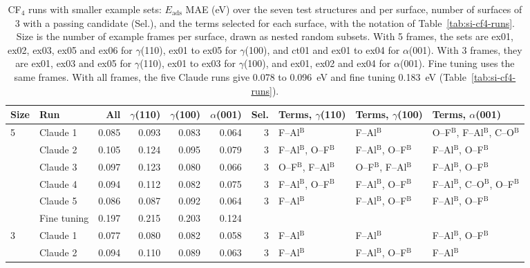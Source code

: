 \begin{table}[h]
\caption{CF$_4$ runs with smaller example sets: $E_\mathrm{ads}$ MAE (eV) over the seven test structures and per surface, number of surfaces of 3 with a passing candidate (Sel.), and the terms selected for each surface, with the notation of Table~\ref{tab:si-cf4-runs}. Size is the number of example frames per surface, drawn as nested random subsets. With 5 frames, the sets are ex01, ex02, ex03, ex05 and ex06 for $\gamma$(110), ex01 to ex05 for $\gamma$(100), and ct01 and ex01 to ex04 for $\alpha$(001). With 3 frames, they are ex01, ex03 and ex05 for $\gamma$(110), ex01 to ex03 for $\gamma$(100), and ex01, ex02 and ex04 for $\alpha$(001). Fine tuning uses the same frames. With all frames, the five Claude runs give 0.078 to 0.096~eV and fine tuning 0.183~eV (Table~\ref{tab:si-cf4-runs}).}\label{tab:si-cf4-nsub}
\scriptsize\renewcommand{\baselinestretch}{1}\selectfont
\setlength{\tabcolsep}{3pt}
\begin{tabular}{llrrrrrlll}
\toprule
Size & Run & All & $\gamma$(110) & $\gamma$(100) & $\alpha$(001) & Sel. & Terms, $\gamma$(110) & Terms, $\gamma$(100) & Terms, $\alpha$(001) \\
\midrule
5 & Claude 1 & 0.085 & 0.093 & 0.083 & 0.064 & 3 & F--Al$^\mathrm{B}$ & F--Al$^\mathrm{B}$ & O--F$^\mathrm{B}$, F--Al$^\mathrm{B}$, C--O$^\mathrm{B}$ \\
 & Claude 2 & 0.105 & 0.124 & 0.095 & 0.079 & 3 & F--Al$^\mathrm{B}$, O--F$^\mathrm{B}$ & F--Al$^\mathrm{B}$, O--F$^\mathrm{B}$ & F--Al$^\mathrm{B}$, O--F$^\mathrm{B}$ \\
 & Claude 3 & 0.097 & 0.123 & 0.080 & 0.066 & 3 & O--F$^\mathrm{B}$, F--Al$^\mathrm{B}$ & O--F$^\mathrm{B}$, F--Al$^\mathrm{B}$ & F--Al$^\mathrm{B}$, O--F$^\mathrm{B}$ \\
 & Claude 4 & 0.094 & 0.112 & 0.082 & 0.075 & 3 & F--Al$^\mathrm{B}$, O--F$^\mathrm{B}$ & F--Al$^\mathrm{B}$, O--F$^\mathrm{B}$ & F--Al$^\mathrm{B}$, C--O$^\mathrm{B}$, O--F$^\mathrm{B}$ \\
 & Claude 5 & 0.086 & 0.087 & 0.092 & 0.064 & 3 & F--Al$^\mathrm{B}$ & F--Al$^\mathrm{B}$, O--F$^\mathrm{B}$ & F--Al$^\mathrm{B}$, O--F$^\mathrm{B}$ \\
 & Fine tuning & 0.197 & 0.215 & 0.203 & 0.124 & & & & \\
\midrule
3 & Claude 1 & 0.077 & 0.080 & 0.082 & 0.058 & 3 & F--Al$^\mathrm{B}$ & F--Al$^\mathrm{B}$ & F--Al$^\mathrm{B}$, O--F$^\mathrm{B}$ \\
 & Claude 2 & 0.094 & 0.110 & 0.089 & 0.063 & 3 & F--Al$^\mathrm{B}$ & F--Al$^\mathrm{B}$, O--F$^\mathrm{B}$ & F--Al$^\mathrm{B}$ \\

\end{tabular}
\end{table}
